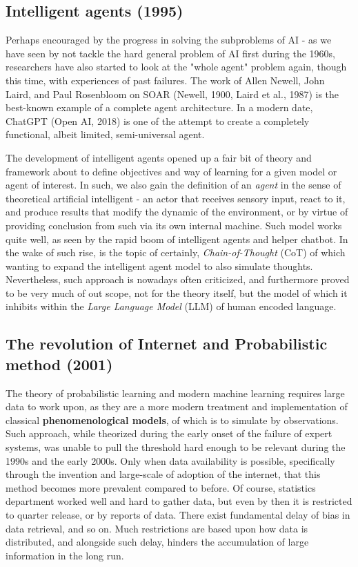 \subsection{Intelligent agents (1995)}

Perhaps encouraged by the progress in solving the subproblems of AI - as we have seen by not tackle the hard general problem of AI first during the 1960s, researchers have also started to look at the "whole agent" problem again, though this time, with experiences of past failures. The work of Allen Newell, John Laird, and Paul Rosenbloom on \textsf{SOAR} (Newell, 1900, Laird et al., 1987) is the best-known example of a complete agent architecture. In a modern date, ChatGPT (Open AI, 2018) is one of the attempt to create a completely functional, albeit limited, semi-universal agent. 

The development of intelligent agents opened up a fair bit of theory and framework about to define objectives and way of learning for a given model or agent of interest. In such, we also gain the definition of an \textit{agent} in the sense of theoretical artificial intelligent - an actor that receives sensory input, react to it, and produce results that modify the dynamic of the environment, or by virtue of providing conclusion from such via its own internal machine. Such model works quite well, as seen by the rapid boom of intelligent agents and helper chatbot. In the wake of such rise, is the topic of certainly, \textit{Chain-of-Thought} (CoT) of which wanting to expand the intelligent agent model to also simulate thoughts. Nevertheless, such approach is nowadays often criticized, and furthermore proved to be very much of out scope, not for the theory itself, but the model of which it inhibits within the \textit{Large Language Model} (LLM) of human encoded language. 
\subsection{The revolution of Internet and Probabilistic method (2001)}

The theory of probabilistic learning and modern machine learning requires large data to work upon, as they are a more modern treatment and implementation of classical \textbf{phenomenological models}, of which is to simulate by observations. Such approach, while theorized during the early onset of the failure of expert systems, was unable to pull the threshold hard enough to be relevant during the 1990s and the early 2000s. Only when data availability is possible, specifically through the invention and large-scale of adoption of the internet, that this method becomes more prevalent compared to before. Of course, statistics department worked well and hard to gather data, but even by then it is restricted to quarter release, or by reports of data. There exist fundamental delay of bias in data retrieval, and so on. Much restrictions are based upon how data is distributed, and alongside such delay, hinders the accumulation of large information in the long run. 

